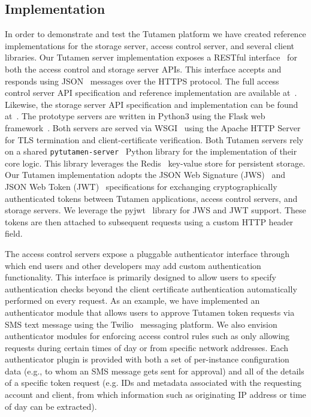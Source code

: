 \subsection{Implementation}

In order to demonstrate and test the Tutamen platform we have created
reference implementations for the storage server, access control
server, and several client libraries. Our Tutamen server
implementation exposes a RESTful interface~\cite{fielding2000} for
both the access control and storage server APIs. This interface
accepts and responds using JSON~\cite{json} messages over the HTTPS
protocol. The full access control server API specification and
reference implementation are available
at~\cite{src-tutamen-apiaccesscontrol}. Likewise, the storage server
API specification and implementation can be found
at~\cite{src-tutamen-apistorage}. The prototype servers are written in
Python3 using the Flask web framework~\cite{python-flask}. Both
servers are served via WSGI~\cite{pep3333} using the Apache HTTP
Server~\cite{apache} for TLS termination and client-certificate
verification. Both Tutamen servers rely on a shared
\texttt{pytutamen-server}~\cite{src-tutamen-pytutamenserver} Python
library for the implementation of their core logic. This library
leverages the Redis~\cite{redis} key-value store for persistent
storage. Our Tutamen implementation adopts the JSON Web Signature
(JWS)~\cite{rfc7515} and JSON Web Token (JWT)~\cite{rfc7519}
specifications for exchanging cryptographically authenticated tokens
between Tutamen applications, access control servers, and storage
servers. We leverage the pyjwt~\cite{pyjwt} library for JWS and JWT
support. These tokens are then attached to subsequent requests using a
custom HTTP header field.

The access control servers expose a pluggable authenticator interface
through which end users and other developers may add custom
authentication functionality. This interface is primarily designed to
allow users to specify authentication checks beyond the client
certificate authentication automatically performed on every
request. As an example, we have implemented an authenticator module
that allows users to approve Tutamen token requests via SMS text
message using the Twilio~\cite{twilio} messaging platform. We also
envision authenticator modules for enforcing access control rules such
as only allowing requests during certain times of day or from specific
network addresses. Each authenticator plugin is provided with both a
set of per-instance configuration data (e.g., to whom an SMS message
gets sent for approval) and all of the details of a specific token
request (e.g. IDs and metadata associated with the requesting account
and client, from which information such as originating IP address or
time of day can be extracted).

